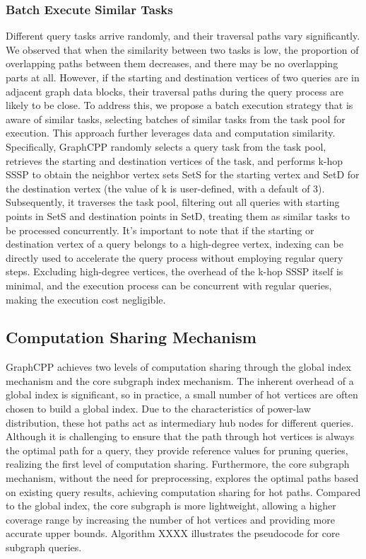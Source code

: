 \documentclass[lettersize,journal]{IEEEtran} %
\begin{document}
\subsubsection{Batch Execute Similar Tasks}

Different query tasks arrive randomly, and their traversal paths vary significantly. We observed that when the similarity between two tasks is low, the proportion of overlapping paths between them decreases, and there may be no overlapping parts at all. However, if the starting and destination vertices of two queries are in adjacent graph data blocks, their traversal paths during the query process are likely to be close. To address this, we propose a batch execution strategy that is aware of similar tasks, selecting batches of similar tasks from the task pool for execution. This approach further leverages data and computation similarity. Specifically, GraphCPP randomly selects a query task from the task pool, retrieves the starting and destination vertices of the task, and performs k-hop SSSP to obtain the neighbor vertex sets SetS for the starting vertex and SetD for the destination vertex (the value of k is user-defined, with a default of 3). Subsequently, it traverses the task pool, filtering out all queries with starting points in SetS and destination points in SetD, treating them as similar tasks to be processed concurrently. It's important to note that if the starting or destination vertex of a query belongs to a high-degree vertex, indexing can be directly used to accelerate the query process without employing regular query steps. Excluding high-degree vertices, the overhead of the k-hop SSSP itself is minimal, and the execution process can be concurrent with regular queries, making the execution cost negligible.


\subsection{Computation Sharing Mechanism}

GraphCPP achieves two levels of computation sharing through the global index mechanism and the core subgraph index mechanism. The inherent overhead of a global index is significant, so in practice, a small number of hot vertices are often chosen to build a global index. Due to the characteristics of power-law distribution, these hot paths act as intermediary hub nodes for different queries. Although it is challenging to ensure that the path through hot vertices is always the optimal path for a query, they provide reference values for pruning queries, realizing the first level of computation sharing. Furthermore, the core subgraph mechanism, without the need for preprocessing, explores the optimal paths based on existing query results, achieving computation sharing for hot paths. Compared to the global index, the core subgraph is more lightweight, allowing a higher coverage range by increasing the number of hot vertices and providing more accurate upper bounds. Algorithm XXXX illustrates the pseudocode for core subgraph queries.
\end{document}
